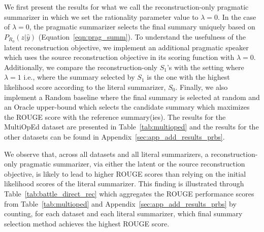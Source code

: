 \documentclass[11pt]{article}
\begin{document}
\begin{table}
\centering
\caption{Frequencies for when the maximal ROUGE score is achieved by the different models described in Section~\ref{sec:prbs}. The frequencies are computed across all datasets and for every literal summarizer implementation.}
\label{tab:battle_direct_rec}
\end{table}


We first present the results for what we call the reconstruction-only pragmatic summarizer in which we set the rationality parameter value to $\lambda = 0$. In the case of $\lambda = 0$, the pragmatic summarizer selects the final summary uniquely based on $P_{R_0}(z|\hat{y})$ (Equation~\ref{eqn:prag_summ}). To understand the usefulness of the latent reconstruction objective, we implement an additional pragmatic speaker which uses the source reconstruction objective in its scoring function with $\lambda = 0$. Additionally, we compare the reconstruction-only $S_1$'s with the setting where $\lambda = 1$ i.e., where the summary selected by $S_1$ is the one with the highest likelihood score according to the literal summarizer, $S_0$. Finally, we also implement a Random baseline where the final summary is selected at random and an Oracle upper-bound which selects the candidate summary which maximizes the ROUGE score with the reference summary(ies). The results for the MultiOpEd dataset are presented in Table~\ref{tab:multioped} and the results for the other datasets can be found in Appendix~\ref{sec:app_add_results_prbs}.

We observe that, across all datasets and all literal summarizers, a reconstruction-only pragmatic summarizer, via either the latent or the source reconstruction objective, is likely to lead to higher ROUGE scores than relying on the initial likelihood scores of the literal summarizer. This finding is illustrated through Table~\ref{tab:battle_direct_rec} which aggregates the ROUGE performance scores from Table~\ref{tab:multioped} and Appendix~\ref{sec:app_add_results_prbs} by counting, for each dataset and each literal summarizer, which final summary selection method achieves the highest ROUGE score.
\end{document}
